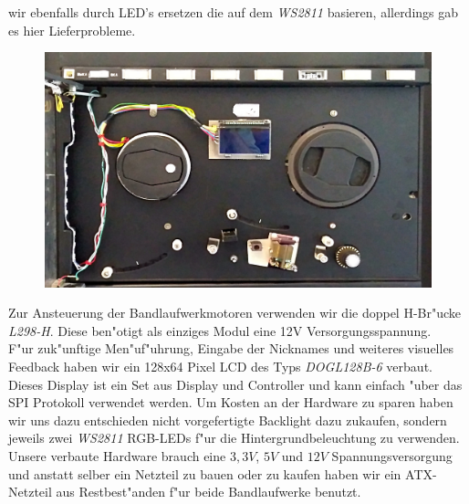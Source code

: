 \documentclass[a4paper]{article}
\begin{document}
    wir ebenfalls durch LED's ersetzen die auf dem \textit{WS2811} basieren,
    allerdings gab es hier Lieferprobleme.\\
    \begin{figure}
      \centering
      \label{figure:Bandlaufwerke}
      \includegraphics[scale=0.075]{Frontansicht.jpg}
    \end{figure}
    Zur Ansteuerung der Bandlaufwerkmotoren verwenden wir die doppel H-Br"ucke
    \textit{L298-H}. Diese ben"otigt als einziges Modul eine 12V
    Versorgungsspannung.\\
    F"ur zuk"unftige Men"uf"uhrung, Eingabe der Nicknames und weiteres
    visuelles Feedback haben wir ein 128x64 Pixel LCD des Typs
    \textit{DOGL128B-6} verbaut. Dieses Display ist ein Set aus Display und
    Controller und kann einfach "uber das SPI Protokoll verwendet werden. Um
    Kosten an der Hardware zu sparen haben wir uns dazu entschieden nicht
    vorgefertigte Backlight dazu zukaufen, sondern jeweils zwei \textit{WS2811}
    RGB-LEDs f"ur die Hintergrundbeleuchtung zu verwenden.\\
    Unsere verbaute Hardware brauch eine \( 3,3V \), \( 5V \) und \( 12V \)
    Spannungsversorgung und anstatt selber ein Netzteil zu bauen oder zu kaufen
    haben wir ein ATX-Netzteil aus Restbest"anden f"ur beide Bandlaufwerke
    benutzt.
\end{document}
